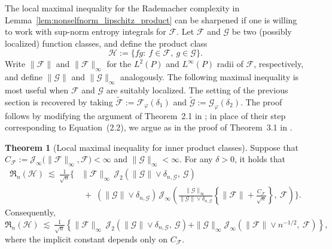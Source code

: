 \documentclass[11pt]{article}
\theoremstyle{plain}
\theoremstyle{definition} %
\newtheorem{theorem}{Theorem}
\begin{document}
 
The local maximal inequality for the Rademacher complexity in Lemma~\ref{lem:nonselfnorm_lipschitz_product} can be sharpened if one is willing to work with sup-norm entropy integrals for $\mathcal F$. Let $\mathcal F$ and $\mathcal G$ be two (possibly localized) function classes, and define the product class
\[
\mathcal H := \{fg:\ f\in\mathcal F,\ g\in\mathcal G\}.
\]
Write $\|\mathcal F\|$ and $\|\mathcal F\|_{\infty}$ for the $L^2(P)$ and $L^\infty(P)$ radii of $\mathcal F$, respectively, and define $\|\mathcal G\|$ and $\|\mathcal G\|_{\infty}$ analogously. The following maximal inequality is most useful when $\mathcal F$ and $\mathcal G$ are suitably localized. The setting of the previous section is recovered by taking $\widetilde{\mathcal F}:=\mathcal F_{\varphi}(\delta_1)$ and $\widetilde{\mathcal G}:=\mathcal G_{\varphi}(\delta_2)$. The proof follows by modifying the argument of Theorem~2.1 in \cite{van2011local}; in place of their step corresponding to Equation~(2.2), we argue as in the proof of Theorem~3.1 in \cite{van2014uniform}.







\begin{theorem}[Local maximal inequality for inner product classes]
\label{theorem::entropyproduct}
Suppose that $C_{\mathcal{F}}
:= \mathcal{J}_{\infty}\bigl(\|\mathcal{F}\|_{\infty},\mathcal{F}\bigr)< \infty$
and $\|\mathcal{G}\|_{\infty} < \infty$. For any $\delta > 0$, it holds that
\begin{align*}
\mathfrak{R}_n(\mathcal{H})
\ \lesssim\
\frac{1}{\sqrt{n}}
\Biggl\{
&\|\mathcal{F}\|_{\infty}\,
\mathcal{J}_2\left(
\|\mathcal{G}\|  \vee \delta_{n,\mathcal{G}},\ \mathcal{G}
\right)\\
&\;+\;
(\|\mathcal{G}\|\vee \delta_{n,\mathcal{G}})\,
\mathcal{J}_{\infty}\left(
\frac{\|\mathcal{G}\|_{\infty}}{\|\mathcal{G}\|\vee \delta_{n,\mathcal{G}}}
\left\{
\|\mathcal{F}\|+\frac{C_{\mathcal{F}}}{\sqrt{n}}
\right\},\ \mathcal{F}
\right)
\Biggr\}.
\end{align*}
Consequently, $\mathfrak{R}_n(\mathcal{H})
\ \lesssim\
\frac{1}{\sqrt{n}}
\left\{
\|\mathcal{F}\|_{\infty}\,
\mathcal{J}_2\left(
\|\mathcal{G}\| \vee \delta_{n,\mathcal{G}},\ \mathcal{G}
\right)
+
\|\mathcal{G}\|_{\infty} \mathcal{J}_{\infty}\left(
\|\mathcal{F}\| \vee n^{-1/2},\ \mathcal{F}
\right)
\right\},$
where the implicit constant depends only on
$C_{\mathcal{F}}$.




\end{theorem}
\end{document}
